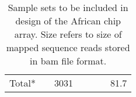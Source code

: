 \begin{table}[htp]
\begin{tabular}{llrrllr}
\hline
Total* &  & 3031 &  &  & & 81.7
\end{tabular}
\caption{Sample sets to be included in design of the African chip array. Size refers to size of mapped sequence reads stored in bam file format.}
\label{tab:samples}
\end{table}